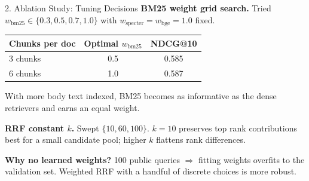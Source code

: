 \documentclass[aspectratio=169, 12pt]{beamer}
\begin{document}
\begin{frame}{2. Ablation Study: Tuning Decisions}
\textbf{BM25 weight grid search.} Tried $w_{\text{bm25}} \in \{0.3, 0.5, 0.7, 1.0\}$
with $w_{\text{specter}} = w_{\text{bge}} = 1.0$ fixed.

\vspace{0.3em}
\centering
\small
\begin{tabular}{lcc}
\toprule
\textbf{Chunks per doc} & \textbf{Optimal $w_{\text{bm25}}$} & \textbf{NDCG@10} \\
\midrule
3 chunks  & 0.5 & 0.585 \\
6 chunks  & 1.0 & 0.587 \\
\bottomrule
\end{tabular}

\vspace{0.6em}
\raggedright
\small
With more body text indexed, BM25 becomes as informative as the dense
retrievers and earns an equal weight.

\vspace{0.8em}
\textbf{RRF constant $k$.} Swept $\{10, 60, 100\}$. $k=10$ preserves top rank
contributions best for a small candidate pool; higher $k$ flattens rank
differences.

\vspace{0.6em}
\textbf{Why no learned weights?} 100 public queries $\Rightarrow$ fitting
weights overfits to the validation set. Weighted RRF with a handful of
discrete choices is more robust.
\end{frame}
\end{document}
